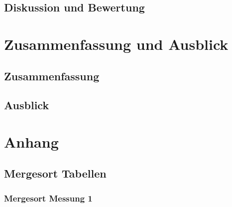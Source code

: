 \documentclass[fontsize=12pt,paper=a4,twoside=semi,parskip=half-,headsepline,headinclude]{scrreprt}
\begin{document}
\section{Diskussion und Bewertung}



\chapter{Zusammenfassung und Ausblick}

\section{Zusammenfassung}

\section{Ausblick}



\printbibliography


\chapter{Anhang}

\section{Mergesort Tabellen}

\subsection{Mergesort Messung 1}
\end{document}
